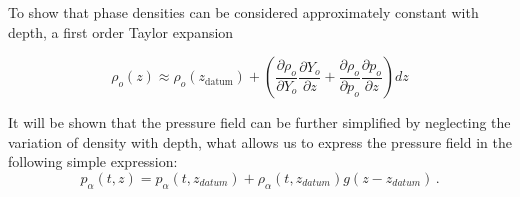 \documentclass[final,authoryear,5p,twocolumn,10pt]{elsarticle}
\begin{document}
To show that phase densities can be considered approximately constant with depth, a first order Taylor expansion




\begin{equation}
\rho_o \left(z\right) \approx \rho_o\left(z_\text{datum}\right)+\left(\frac{\partial \rho_o}{\partial Y_o}\frac{\partial Y_o}{\partial z}+\frac{\partial \rho_o}{\partial p_o}\frac{\partial p_o}{\partial z}\right) dz
\end{equation}





It will be shown that the pressure field can be further simplified by neglecting the variation of density with depth, what allows us to express the pressure field in the following simple expression:
\begin{equation}
p_\alpha (t,z) = p_\alpha \left(t, z_{datum}\right)+ \rho_\alpha (t, z_{datum}) g \left(z-z_{datum}\right) \, .
\end{equation}


\end{document}

